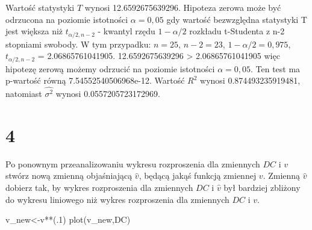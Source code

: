 \documentclass[
  12pt,
]{article}
\newenvironment{Shaded}{\begin{snugshade}}{\end{snugshade}}
\newcommand{\DecValTok}[1]{\textcolor[rgb]{0.00,0.00,0.81}{#1}}
\newcommand{\FloatTok}[1]{\textcolor[rgb]{0.00,0.00,0.81}{#1}}
\newcommand{\FunctionTok}[1]{\textcolor[rgb]{0.00,0.00,0.00}{#1}}
\newcommand{\NormalTok}[1]{#1}
\newcommand{\OtherTok}[1]{\textcolor[rgb]{0.56,0.35,0.01}{#1}}
\newcommand{\SpecialCharTok}[1]{\textcolor[rgb]{0.00,0.00,0.00}{#1}}
\begin{document}
\begin{Shaded}
\end{Shaded}

Wartość statystyki \(T\) wynosi 12.6592675639296. Hipoteza zerowa może
być odrzucona na poziomie istotności \(\alpha = 0,05\) gdy wartość
bezwzględna statystyki T jest większa niż \(t_{\alpha/2,n-2}\) - kwantyl
rzędu \(1-\alpha/2\) rozkładu t-Studenta z n-2 stopniami swobody. W tym
przypadku: \(n=25\), \(n-2=23\), \(1-\alpha/2 = 0,975\),
\(t_{\alpha/2,n-2}\) = 2.06865761041905. 12.6592675639296 \textgreater{}
2.06865761041905 więc hipotezę zerową możemy odrzucić na poziomie
istotności \(\alpha = 0,05\). Ten test ma p-wartość równą
7.54552540506968e-12. Wartość \(R^{2}\) wynosi 0.874493235919481,
natomiast \(\hat{\sigma^{2}}\) wynosi 0.0557205723172969.

\hypertarget{section-3}{%
\section{4}\label{section-3}}

Po ponownym przeanalizowaniu wykresu rozproszenia dla zmiennych \(DC\) i
\(v\) stwórz nową zmienną objaśniającą \(\hat{v}\), będącą jakąś funkcją
zmiennej \(v\). Zmienną \(\hat{v}\) dobierz tak, by wykres rozproszenia
dla zmiennych \(DC\) i \(\hat{v}\) był bardziej zbliżony do wykresu
liniowego niż wykres rozproszenia dla zmiennych \(DC\) i \(v\).

\begin{Shaded}
\begin{Highlighting}[]
\NormalTok{v\_new}\OtherTok{\textless{}{-}}\NormalTok{v}\SpecialCharTok{**}\NormalTok{(.}\DecValTok{1}\NormalTok{)}
\FunctionTok{plot}\NormalTok{(v\_new,DC)}
\end{Highlighting}
\end{Shaded}
\end{document}
